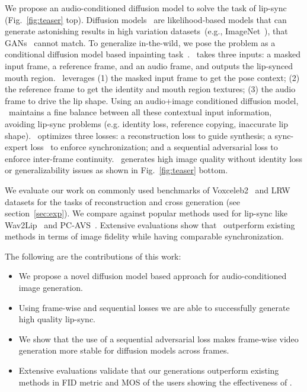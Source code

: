 We propose an audio-conditioned diffusion model to solve the task of lip-sync (Fig.~\ref{fig:teaser} top). 
Diffusion models~\cite{ddpm} are likelihood-based models that can generate astonishing results in high variation datasets~(e.g., ImageNet~\cite{imagenet}), that GANs~\cite{gan} cannot match. To generalize in-the-wild, we pose the problem as a conditional diffusion model based inpainting task~\cite{palette}. \ours  ~takes three inputs: a masked input frame, a reference frame, and an audio frame, and outputs the lip-synced mouth region. \ours  ~leverages (1) the masked input frame to get the pose context; (2) the reference frame to get the identity and mouth region textures; (3) the audio frame to drive the lip shape.
Using an audio+image conditioned diffusion model, \ours  ~maintains a fine balance between all these contextual input information, avoiding lip-sync problems (e.g. identity loss, reference copying, inaccurate lip shape). \ours  ~optimizes three losses: a reconstruction loss to guide synthesis; a sync-expert loss~\cite{wav2lip} to enforce synchronization; and a sequential adversarial loss to enforce inter-frame continuity.
\ours  ~generates high image quality without identity loss or generalizability issues as shown in Fig.~\ref{fig:teaser} bottom.



 






We evaluate our work on commonly used benchmarks of Voxceleb2~\cite{voxceleb2} and LRW~\cite{lrw} datasets for the tasks of reconstruction and cross generation (see section~\ref{sec:exp}). We compare against popular methods used for lip-sync like Wav2Lip~\cite{wav2lip} and PC-AVS~\cite{pcavs}. 
Extensive evaluations show that \ours ~outperform existing methods in terms of image fidelity while having comparable synchronization.


The following are the contributions of this work:
\begin{itemize}[noitemsep,topsep=0pt]
    \item  
    We propose a novel diffusion model based approach for audio-conditioned image generation.
    \item Using frame-wise and sequential losses we are able to successfully generate high quality lip-sync.
    \item We show that the use of a sequential adversarial loss makes frame-wise video generation more stable for diffusion models across frames.
    \item Extensive evaluations validate that our generations outperform existing methods in FID metric and MOS of the users showing the effectiveness of \ours. 
\end{itemize}

